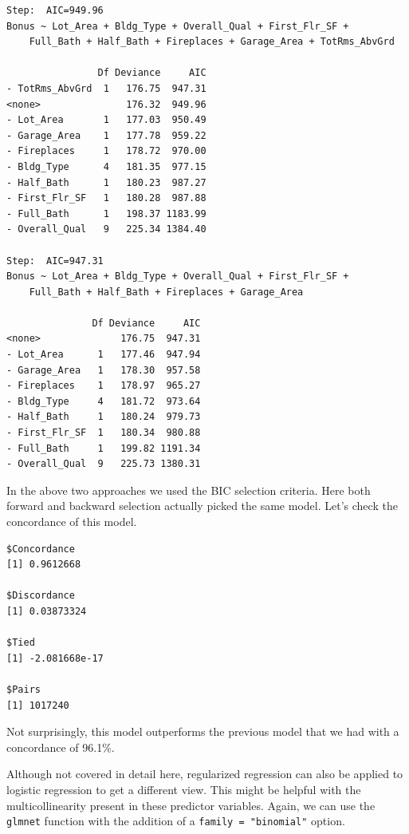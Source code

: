\documentclass[
  letterpaper,
  DIV=11,
  numbers=noendperiod]{scrreprt}
\newenvironment{Shaded}{\begin{snugshade}}{\end{snugshade}}
\newcommand{\AttributeTok}[1]{\textcolor[rgb]{0.40,0.45,0.13}{#1}}
\newcommand{\FunctionTok}[1]{\textcolor[rgb]{0.28,0.35,0.67}{#1}}
\newcommand{\NormalTok}[1]{\textcolor[rgb]{0.00,0.23,0.31}{#1}}
\newcommand{\SpecialCharTok}[1]{\textcolor[rgb]{0.37,0.37,0.37}{#1}}
\newcommand{\StringTok}[1]{\textcolor[rgb]{0.13,0.47,0.30}{#1}}
\begin{document}
\begin{verbatim}
Step:  AIC=949.96
Bonus ~ Lot_Area + Bldg_Type + Overall_Qual + First_Flr_SF + 
    Full_Bath + Half_Bath + Fireplaces + Garage_Area + TotRms_AbvGrd

                Df Deviance     AIC
- TotRms_AbvGrd  1   176.75  947.31
<none>               176.32  949.96
- Lot_Area       1   177.03  950.49
- Garage_Area    1   177.78  959.22
- Fireplaces     1   178.72  970.00
- Bldg_Type      4   181.35  977.15
- Half_Bath      1   180.23  987.27
- First_Flr_SF   1   180.28  987.88
- Full_Bath      1   198.37 1183.99
- Overall_Qual   9   225.34 1384.40

Step:  AIC=947.31
Bonus ~ Lot_Area + Bldg_Type + Overall_Qual + First_Flr_SF + 
    Full_Bath + Half_Bath + Fireplaces + Garage_Area

               Df Deviance     AIC
<none>              176.75  947.31
- Lot_Area      1   177.46  947.94
- Garage_Area   1   178.30  957.58
- Fireplaces    1   178.97  965.27
- Bldg_Type     4   181.72  973.64
- Half_Bath     1   180.24  979.73
- First_Flr_SF  1   180.34  980.88
- Full_Bath     1   199.82 1191.34
- Overall_Qual  9   225.73 1380.31
\end{verbatim}

In the above two approaches we used the BIC selection criteria. Here
both forward and backward selection actually picked the same model.
Let's check the concordance of this model.

\begin{Shaded}
\end{Shaded}

\begin{verbatim}
$Concordance
[1] 0.9612668

$Discordance
[1] 0.03873324

$Tied
[1] -2.081668e-17

$Pairs
[1] 1017240
\end{verbatim}

Not surprisingly, this model outperforms the previous model that we had
with a concordance of 96.1\%.

Although not covered in detail here, regularized regression can also be
applied to logistic regression to get a different view. This might be
helpful with the multicollinearity present in these predictor variables.
Again, we can use the \texttt{glmnet} function with the addition of a
\texttt{family\ =\ "binomial"} option.
\end{document}
